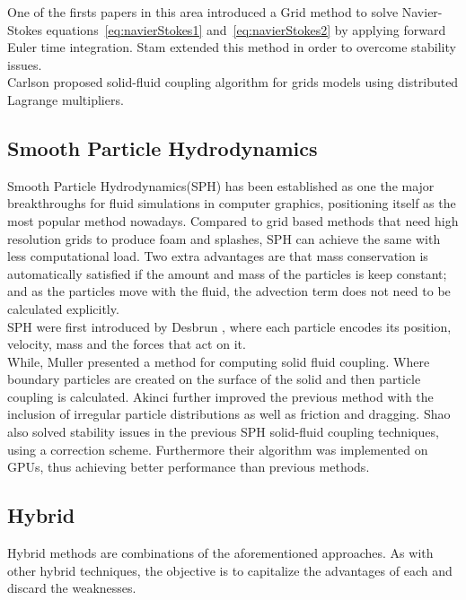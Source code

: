 One of the firsts papers in this area introduced a Grid method \cite{Foster1996} to solve Navier-Stokes equations~\ref{eq:navierStokes1} and~\ref{eq:navierStokes2} by applying forward Euler time integration. 
Stam \cite{Stam1999} extended this method in order to overcome stability issues.\\

Carlson \cite{Carlson2004} proposed solid-fluid coupling algorithm for grids models using distributed Lagrange multipliers.

\subsection{Smooth Particle Hydrodynamics}

Smooth Particle Hydrodynamics(SPH) has been established as one the major breakthroughs for fluid simulations in computer graphics, positioning itself as the most popular method nowadays.
Compared to grid based methods that need high resolution grids to produce foam and splashes, SPH can achieve the same with less computational load.
Two extra advantages are that mass conservation is automatically satisfied if the amount and mass of the particles is keep constant;
and as the particles move with the fluid, the advection term does not need to be calculated explicitly.\\

SPH were first introduced by Desbrun \cite{DesbrunMathieuandGascuel1996}, where each particle encodes its position, velocity, mass and the forces that act on it.\\

While, Muller \cite{Muller2004} presented a method for computing solid fluid coupling. Where boundary particles are created on the surface of the solid and then particle coupling is calculated.
Akinci \cite{Akinci2012} further improved the previous method with the inclusion of irregular particle distributions as well as friction and dragging. 
Shao \cite{Shao2014} also solved stability issues in the previous SPH solid-fluid coupling techniques, using a correction scheme.
Furthermore their algorithm was implemented on GPUs, thus achieving better performance than previous methods.  

\subsection{Hybrid}

Hybrid methods are combinations of the aforementioned approaches.
As with other hybrid techniques, the objective is to capitalize the advantages of each and discard the weaknesses.\\

